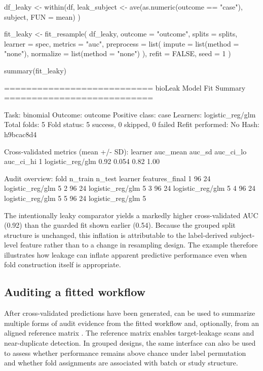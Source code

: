\documentclass[article,shortnames]{jss}
\begin{document}
\begin{CodeInput}
df_leaky <- within(df, {
  leak_subject <- ave(as.numeric(outcome == "case"), subject, FUN = mean)
})

fit_leaky <- fit_resample(
  df_leaky,
  outcome = "outcome",
  splits = splits,
  learner = spec,
  metrics = "auc",
  preprocess = list(
    impute = list(method = "none"),
    normalize = list(method = "none")
  ),
  refit = FALSE,
  seed = 1
)

summary(fit_leaky)
\end{CodeInput}
\begin{CodeOutput}
===========================
 bioLeak Model Fit Summary
===========================

Task: binomial
Outcome: outcome
Positive class: case
Learners: logistic_reg/glm
Total folds: 5
Fold status: 5 success, 0 skipped, 0 failed
Refit performed: No
Hash: h9bcac8d4

Cross-validated metrics (mean +/- SD):
           learner auc_mean auc_sd auc_ci_lo auc_ci_hi
1 logistic_reg/glm     0.92  0.054      0.82      1.00

Audit overview:
 fold n_train n_test          learner features_final
    1      96     24 logistic_reg/glm              5
    2      96     24 logistic_reg/glm              5
    3      96     24 logistic_reg/glm              5
    4      96     24 logistic_reg/glm              5
    5      96     24 logistic_reg/glm              5
\end{CodeOutput}

\noindent
The intentionally leaky comparator yields a markedly higher cross-validated AUC (0.92) than the guarded fit shown earlier (0.54). Because the grouped split structure is unchanged, this inflation is attributable to the label-derived subject-level feature rather than to a change in resampling design. The example therefore illustrates how leakage can inflate apparent predictive performance even when fold construction itself is appropriate.

\subsection{Auditing a fitted workflow}

After cross-validated predictions have been generated,  can be used to summarize multiple forms of audit evidence from the fitted workflow and, optionally, from an aligned reference matrix . The reference matrix enables target-leakage scans and near-duplicate detection. In grouped designs, the same interface can also be used to assess whether performance remains above chance under label permutation and whether fold assignments are associated with batch or study structure.
\end{document}
